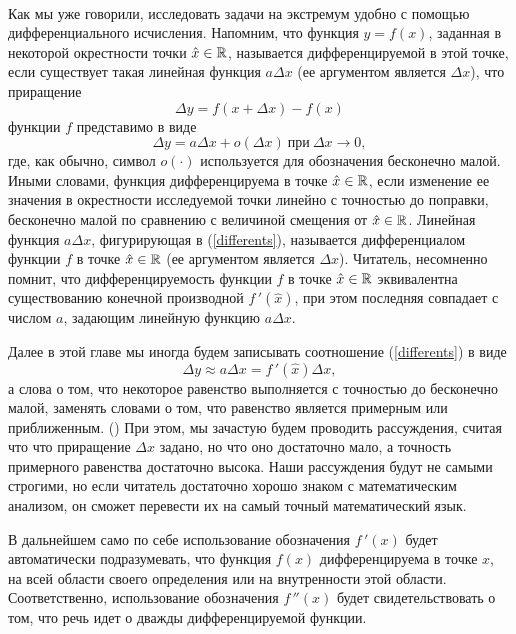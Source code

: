 \


    Как мы уже говорили, исследовать задачи на экстремум удобно с
    помощью дифференциального исчисления.
    Напомним, что функция $y=f(x)$, заданная в некоторой окрестности
    точки $\hat{x}\in\mathbb{R}$,  называется дифференцируемой в этой точке,
    если существует такая линейная функция $a\Delta x$
    (ее аргументом является $\Delta x$), что приращение
    \[\Delta y=f(x+\Delta x)-f(x)\]
    функции $f$ представимо в виде
\begin{equation}
\label{differents}
    \Delta y=a\Delta x+o(\Delta x) \ \text{при} \ \Delta x\rightarrow 0,
\end{equation}
    где, как обычно, символ $o(\cdot)$ используется для обозначения
    бесконечно малой.
    Иными словами, функция дифференцируема в точке $\hat{x}\in\mathbb{R}$,
    если изменение ее значения в окрестности исследуемой точки
    линейно с точностью до поправки, бесконечно малой по сравнению с
    величиной смещения от $\hat{x}\in\mathbb{R}$. Линейная функция $a\Delta x$,
    фигурирующая в (\ref{differents}), называется дифференциалом
    функции $f$ в точке $\hat{x}\in\mathbb{R}$ (ее аргументом является $\Delta x$).
    Читатель, несомненно помнит, что  дифференцируемость функции $f$ в
    точке $\hat{x}\in\mathbb{R}$ эквивалентна существованию конечной производной
    $f\,'(\hat{x})$, при этом последняя совпадает с числом $a$,
    задающим линейную функцию $a\Delta x$.

    Далее в этой главе мы иногда будем записывать соотношение (\ref{differents}) в
    виде
    \[\Delta y\approx a\Delta x=f\,'(\hat{x})\Delta x,\]
    а слова о том, что некоторое равенство выполняется с точностью
    до бесконечно малой, заменять словами о том, что равенство
    является примерным или приближенным. ()
    При этом, мы зачастую будем
    проводить рассуждения, считая что что приращение  $\Delta x$
    задано, но что оно достаточно мало, а точность примерного
    равенства достаточно высока. Наши рассуждения будут
    не самыми строгими, но если читатель достаточно хорошо знаком с
    математическим анализом, он сможет перевести их на
    самый точный математический язык.

    В дальнейшем само по себе использование обозначения $f\,'(x)$
    будет автоматически подразумевать, что функция $f(x)$ дифференцируема в точке
    $x$, на всей области своего определения
    или на внутренности этой области. Соответственно,
    использование обозначения $f\,''(x)$ будет свидетельствовать о
    том, что речь идет о дважды дифференцируемой функции.

